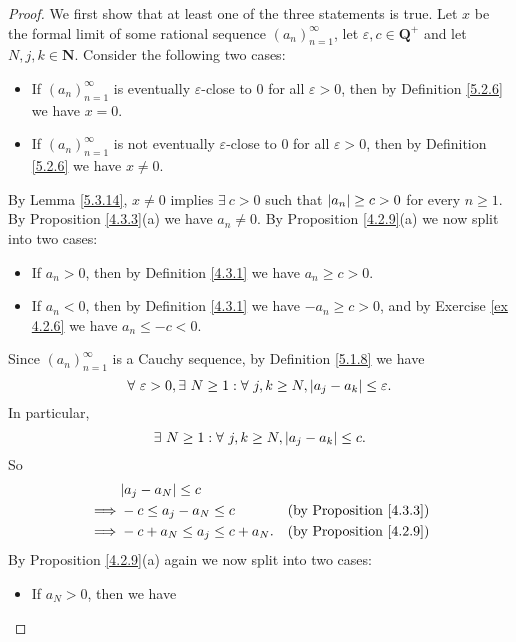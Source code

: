 \begin{proof}
    We first show that at least one of the three statements is true.
    Let \(x\) be the formal limit of some rational sequence \((a_n)_{n = 1}^{\infty}\), let \(\varepsilon, c \in \mathbf{Q}^+\) and let \(N, j, k \in \mathbf{N}\).
    Consider the following two cases:
    \begin{itemize}
        \item If \((a_n)_{n = 1}^{\infty}\) is eventually \(\varepsilon\)-close to \(0\) for all \(\varepsilon > 0\), then by Definition \ref{5.2.6} we have \(x = 0\).
        \item If \((a_n)_{n = 1}^{\infty}\) is not eventually \(\varepsilon\)-close to \(0\) for all \(\varepsilon > 0\), then by Definition \ref{5.2.6} we have \(x \neq 0\).
    \end{itemize}
    By Lemma \ref{5.3.14}, \(x \neq 0\) implies \(\exists\ c > 0\) such that \(\abs*{a_n} \geq c > 0\) for every \(n \geq 1\).
    By Proposition \ref{4.3.3}(a) we have \(a_n \neq 0\).
    By Proposition \ref{4.2.9}(a) we now split into two cases:
    \begin{itemize}
        \item If \(a_n > 0\), then by Definition \ref{4.3.1} we have \(a_n \geq c > 0\).
        \item If \(a_n < 0\), then by Definition \ref{4.3.1} we have \(-a_n \geq c > 0\), and by Exercise \ref{ex 4.2.6} we have \(a_n \leq -c < 0\).
    \end{itemize}
    Since \((a_n)_{n = 1}^{\infty}\) is a Cauchy sequence, by Definition \ref{5.1.8} we have
    \[
        \forall\ \varepsilon > 0, \exists\ N \geq 1 : \forall\ j, k \geq N, \abs*{a_j - a_k} \leq \varepsilon.
    \]
    In particular,
    \[
        \exists\ N \geq 1 : \forall\ j, k \geq N, \abs*{a_j - a_k} \leq c.
    \]
    So
    \begin{align*}
                 & \abs*{a_j - a_N} \leq c                                               \\
        \implies & -c \leq a_j - a_N \leq c        & \text{(by Proposition \ref{4.3.3})} \\
        \implies & -c + a_N \leq a_j \leq c + a_N. & \text{(by Proposition \ref{4.2.9})} \\
    \end{align*}
    By Proposition \ref{4.2.9}(a) again we now split into two cases:
    \begin{itemize}
        \item If \(a_N > 0\), then we have

\end{itemize}
\end{proof}
